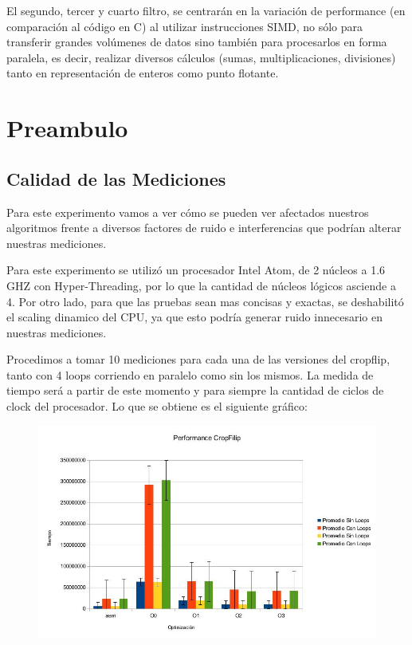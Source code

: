 \documentclass[a4paper]{article}
\begin{document}
El segundo, tercer y cuarto filtro, se centrarán en la variación de performance (en comparación al código en C) al utilizar instrucciones SIMD, no sólo para transferir grandes volúmenes de datos sino también para procesarlos en forma paralela, es decir, realizar diversos cálculos (sumas, multiplicaciones, divisiones) tanto en representación de enteros como punto flotante.

\section{Preambulo}

\subsection{Calidad de las Mediciones}
Para este experimento vamos a ver cómo se pueden ver afectados nuestros algoritmos frente a diversos factores de ruido e interferencias que podrían alterar nuestras mediciones.

Para este experimento se utilizó un procesador Intel Atom, de 2 núcleos a 1.6 GHZ con Hyper-Threading, por lo que la cantidad de núcleos lógicos asciende a 4. Por otro lado, para que las pruebas sean mas concisas y exactas, se deshabilitó el scaling dinamico del CPU, ya que esto podría generar ruido innecesario en nuestras mediciones.

Procedimos a tomar 10 mediciones para cada una de las versiones del cropflip, tanto con 4 loops corriendo en paralelo como sin los mismos. La medida de tiempo será a partir de este momento y para siempre la cantidad de ciclos de clock del procesador. Lo que se obtiene es el siguiente gráfico:
\\
\begin{figure}[h!]
  \begin{center}
  \includegraphics[scale=0.66]{Graficos1.4/1.3/per.jpg}
  \label{nombreparareferenciar1}
  \end{center}
\end{figure}
\\
\end{document}

